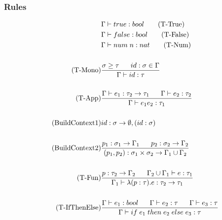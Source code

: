 \documentclass[10pt,a4paper,master=cws, masteroption=ai,english,inputenc=utf8]{kulemt}
\begin{document}
\subsubsection{Rules}
\begin{align*}
&\Gamma \vdash true : bool \tag{T-True} \\
&\Gamma \vdash false : bool \tag{T-False} \\
&\Gamma \vdash num \; n : nat \tag{T-Num} \\ \\
\tag{T-Mono}
&\frac{\sigma \geq \tau \longspace id:\sigma \in \Gamma}{\Gamma \vdash id:\tau}\\ \\
\tag{T-App}
&\frac{\Gamma \vdash e_{1}:\tau_{2} \rightarrow \tau_{1} \longspace \Gamma \vdash e_{2}:\tau_{2}}
{\Gamma \vdash e_{1}e_{2}:\tau_{1}} \\ \\
\tag{BuildContext1}
& id:\sigma \rightarrow \emptyset, (id:\sigma) \\ \\
\tag{BuildContext2}
&\frac{p_{1}:\sigma_{1} \rightarrow \Gamma_{1} \longspace p_{2}:\sigma_{2}\rightarrow \Gamma_{2}}
{(p_{1},p_{2}):\sigma_{1}\times \sigma_{2} \rightarrow \Gamma_{1}\cup \Gamma_{2}} \\ \\
\tag{T-Fun}
&\frac{p:\tau_{2} \rightarrow \Gamma_{2} \longspace \Gamma_{2} \cup \Gamma_{1} \vdash e:\tau_{1}}
{\Gamma_{1} \vdash \lambda(p:\tau).e:\tau_{2} \rightarrow \tau_{1}} \\ \\
\tag{T-IfThenElse}
&\frac{\Gamma \vdash e_{1}:bool \longspace \Gamma \vdash e_{2}:\tau \longspace \Gamma \vdash e_{3} : \tau}
{\Gamma \vdash if \; e_{1} \; then \; e_{2} \; else \; e_{3} : \tau} \\ \\

\end{align*}
\end{document}
